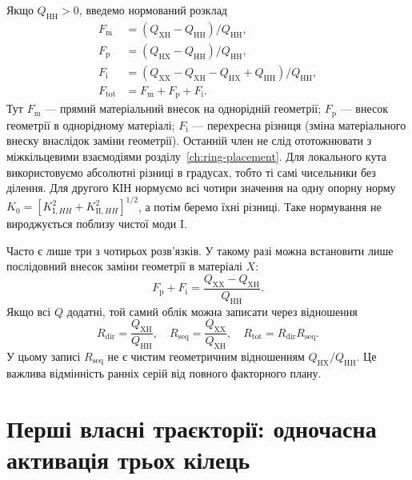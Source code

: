 Якщо $Q_{\mathrm{HH}}>0$, введемо нормований розклад
\begin{equation}
 \begin{aligned}
 F_{\mathrm m}&=(Q_{\mathrm{XH}}-Q_{\mathrm{HH}})/Q_{\mathrm{HH}},\\
 F_{\mathrm p}&=(Q_{\mathrm{HX}}-Q_{\mathrm{HH}})/Q_{\mathrm{HH}},\\
 F_{\mathrm i}&=(Q_{\mathrm{XX}}-Q_{\mathrm{XH}}-
                  Q_{\mathrm{HX}}+Q_{\mathrm{HH}})/Q_{\mathrm{HH}},\\
 F_{\mathrm{tot}}&=F_{\mathrm m}+F_{\mathrm p}+F_{\mathrm i}.
 \end{aligned}
 \label{eq:feedback-additive}
\end{equation}
Тут $F_{\mathrm m}$ --- прямий матеріальний внесок на однорідній геометрії; $F_{\mathrm p}$ --- внесок геометрії в однорідному матеріалі; $F_{\mathrm i}$ --- перехресна різниця (зміна матеріального внеску внаслідок заміни геометрії). Останній член не слід ототожнювати з міжкільцевими взаємодіями розділу~\ref{ch:ring-placement}. Для локального кута використовуємо абсолютні різниці в градусах, тобто ті самі чисельники без ділення. Для другого КІН нормуємо всі чотири значення на одну опорну норму $K_0=[K_{\mathrm I,HH}^2+K_{\mathrm{II},HH}^2]^{1/2}$, а потім беремо їхні різниці. Таке нормування не вироджується поблизу чистої моди I.

Часто є лише три з чотирьох розв'язків. У такому разі можна встановити лише послідовний внесок заміни геометрії в матеріалі $X$:
\begin{equation}
 F_{\mathrm p}+F_{\mathrm i}
 =\frac{Q_{\mathrm{XX}}-Q_{\mathrm{XH}}}{Q_{\mathrm{HH}}}.
 \label{eq:feedback-sequential}
\end{equation}
Якщо всі $Q$ додатні, той самий облік можна записати через відношення
\begin{equation}
 R_{\mathrm{dir}}=\frac{Q_{\mathrm{XH}}}{Q_{\mathrm{HH}}},
 \quad R_{\mathrm{seq}}=\frac{Q_{\mathrm{XX}}}{Q_{\mathrm{XH}}},
 \quad R_{\mathrm{tot}}=R_{\mathrm{dir}}R_{\mathrm{seq}}.
 \label{eq:feedback-ratio}
\end{equation}
У цьому записі $R_{\mathrm{seq}}$ не є чистим геометричним відношенням $Q_{\mathrm{HX}}/Q_{\mathrm{HH}}$. Це важлива відмінність ранніх серій від повного факторного плану.

\section{Перші власні траєкторії: одночасна активація трьох кілець}
\label{sec:feedback-m3}

